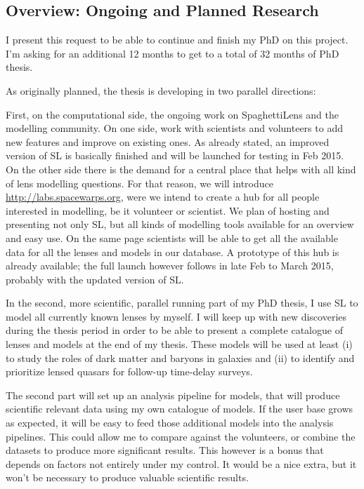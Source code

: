 \documentclass[11pt]{article}
\begin{document}
\subsection{Overview: Ongoing and Planned Research}

I present this request to be able to continue and finish my PhD on this project.
I'm asking for an additional 12 months to get to a total of 32 months of PhD thesis.

As originally planned, the thesis is developing in two parallel directions:

First, on the computational side, the ongoing work on SpaghettiLens and the modelling community.
On one side, work with scientists and volunteers to add new features and improve on existing ones.
As already stated, an improved version of SL is basically finished and will be launched for testing in Feb 2015.
On the other side there is the demand for a central place that helps with all kind of lens modelling questions.
For that reason, we will introduce \url{http://labs.spacewarps.org}, were we intend to create a hub for all people interested in modelling, be it volunteer or scientist.
We plan of hosting and presenting not only SL, but all kinds of modelling tools available for an overview and easy use.
On the same page scientists will be able to get all the available data for all the lenses and models in our database.
A prototype of this hub is already available; the full launch however follows in late Feb to March 2015, probably with the updated version of SL.


In the second, more scientific, parallel running part of my PhD thesis, I use SL to model all currently known lenses by myself.
I will keep up with new discoveries during the thesis period in order to be able to present a complete catalogue of lenses and models at the end of my thesis.
These models will be used at least (i) to study the roles of dark matter and baryons in galaxies and (ii) to identify and prioritize lensed quasars for follow-up time-delay surveys.

The second part will set up an analysis pipeline for models, that will produce scientific relevant data using my own catalogue of models.
If the user base grows as expected, it will be easy to feed those additional models into the analysis pipelines.
This could allow me to compare against the volunteers, or combine the datasets to produce more significant results.
This however is a bonus that depends on factors not entirely under my control.
It would be a nice extra, but it won't be necessary to produce valuable scientific results.
\end{document}

